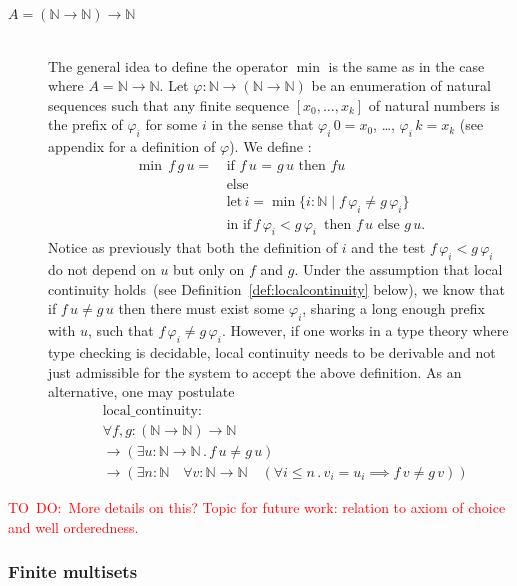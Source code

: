 \documentclass[envcountsame]{llncs}
\newcommand{\todo}[1]{\textcolor{red}{TO~DO:~#1}}
\newcommand{\N}{\mathbb{N}}
\begin{document}
\begin{description}
\bigskip
\item[$A=(\N\to\N)\to\N$] \hfill\\
The general idea to define the operator $\min$ is the same as in the case where $A=\N\to\N$. Let $\varphi : \N \to (\N\to\N)$ be an enumeration of natural sequences such that any finite sequence $[x_0,\dots,x_k]$ of
natural numbers is the prefix of $\varphi_i$ for some $i$  in the sense that $\varphi_i \,0 = x_0$, \dots, $\varphi_i\,k = x_k$ (see appendix for a definition of $\varphi$).
We define : 
\begin{align*}
 \min\,f\,g\,u =\,&\text{if $f \,u$ = $g\,u$ then $f u$}\\
                 &\text{else }\\
                 &\text{let}\,i = \min \{ i : \N\mid f\,\varphi_ i \not= g\,\varphi_ i \}\\
                 &\text{in }\text{if}\, f\,\varphi_ i< g\,\varphi_ i\,\text{ then } f\,u \text{ else } g\,u.
\end{align*}
Notice as previously that both the definition of $i$ and the test $f\,\varphi_i < g\,\varphi_ i$ do not depend on $u$ but only on $f$ and $g$. Under the assumption that local continuity holds~(see Definition~\ref{def:localcontinuity} below), we know that if $f\,u\not=g\,u$ then there must exist some $\varphi_i$, sharing a long enough prefix with $u$, such that $f\,\varphi_ i \not= g\,\varphi_ i$. However, if one works in a type theory where type checking is decidable, local continuity needs to be derivable and not just admissible for the system to accept the above definition. As an alternative, one may  postulate
\begin{align*}
&\text{local\_continuity}:\\
&\forall f,g: (\N\to\N)\to\N\\
&\to(\exists u:\N\to\N\,.\,f\,u\neq g\,u)\\
&\to (\exists n:\N \quad \forall v:\N\to\N\quad(\forall i\leq n\,.\,v_i= u_i\implies f\,v\neq g\,v))  
\end{align*}
   
\end{description}
\todo{More details on this? Topic for future work: relation to axiom of choice and well orderedness.}

\subsubsection*{Finite multisets}
\end{document}
